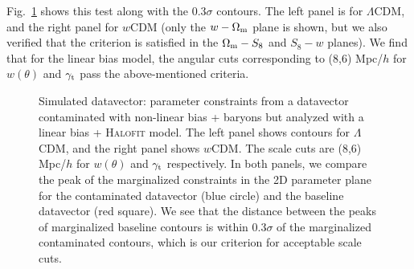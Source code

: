 \documentclass[aps, prd,twocolumn,superscriptaddress,nofootinbib,preprintnumbers]{revtex4-1}
\newcommand{\lcdm}{$\Lambda$CDM}
\newcommand{\wcdm}{$w$CDM}
\begin{document}
Fig.~\ref{fig:sim_lin} shows this test along with the 0.3$\sigma$ contours. The left panel is for $\Lambda$CDM, and the right panel for $w$CDM (only the $w- \Omega_{\rm m}$ plane is shown, but we also verified that the criterion is satisfied in the $\Omega_{\rm m}-S_8$ and $S_8-w$  planes). We find that for the linear bias model, the angular cuts corresponding to (8,6) Mpc/$h$ for $w(\theta)$ and $\gamma_{\rm t}$ pass the above-mentioned criteria. 

\begin{figure}
\centering
{}
\hfill
{}
    \caption[]{Simulated datavector: parameter constraints from a datavector contaminated with non-linear bias + baryons but analyzed with a linear bias + \textsc{Halofit} model. The left panel shows contours for \lcdm, and the right panel shows \wcdm. The scale cuts are (8,6) Mpc/$h$ for $w(\theta)$ and $\gamma_{\rm t}$ respectively. In both panels, we compare the peak of the marginalized constraints in the 2D  parameter plane for the contaminated datavector (blue circle) and the baseline datavector  (red square). We see that the distance between the peaks of marginalized baseline contours is within 0.3$\sigma$ of the marginalized contaminated contours, which is our criterion for acceptable scale cuts. }
\label{fig:sim_lin}    
\end{figure}
\end{document}
